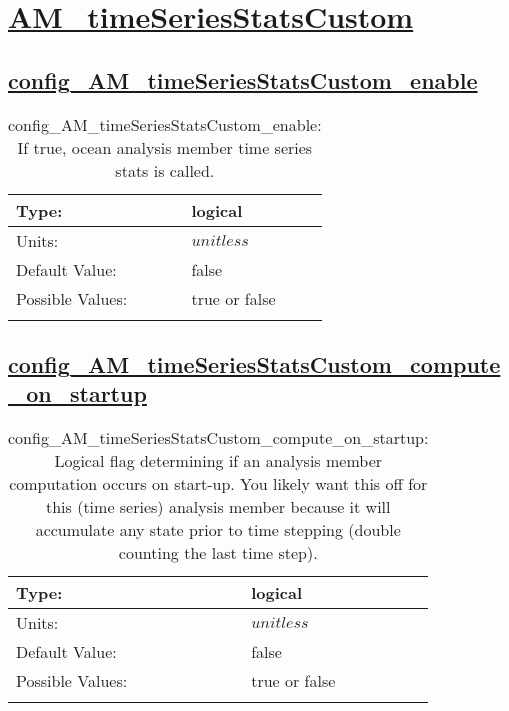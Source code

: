 \section[AM\_timeSeriesStatsCustom]{\hyperref[sec:nm_tab_AM_timeSeriesStatsCustom]{AM\_timeSeriesStatsCustom}}
\label{sec:nm_sec_AM_timeSeriesStatsCustom}
\subsection[config\_AM\_timeSeriesStatsCustom\_enable]{\hyperref[sec:nm_tab_AM_timeSeriesStatsCustom]{config\_AM\_timeSeriesStatsCustom\_enable}}
\label{subsec:nm_sec_config_AM_timeSeriesStatsCustom_enable}
\begin{center}
\begin{longtable}{| p{2.0in} || p{4.0in} |}
    \hline
    Type: & logical \\
    \hline
    Units: & $unitless$ \\
    \hline
    Default Value: & false \\
    \hline
    Possible Values: & true or false \\
    \hline
    \caption{config\_AM\_timeSeriesStatsCustom\_enable: If true, ocean analysis member time series stats is called.}
\end{longtable}
\end{center}
\subsection[config\_AM\_timeSeriesStatsCustom\_compute\_on\_startup]{\hyperref[sec:nm_tab_AM_timeSeriesStatsCustom]{config\_AM\_timeSeriesStatsCustom\_compute\_on\_startup}}
\label{subsec:nm_sec_config_AM_timeSeriesStatsCustom_compute_on_startup}
\begin{center}
\begin{longtable}{| p{2.0in} || p{4.0in} |}
    \hline
    Type: & logical \\
    \hline
    Units: & $unitless$ \\
    \hline
    Default Value: & false \\
    \hline
    Possible Values: & true or false \\
    \hline
    \caption{config\_AM\_timeSeriesStatsCustom\_compute\_on\_startup: Logical flag determining if an analysis member computation occurs on start-up. You likely want this off for this (time series) analysis member because it will accumulate any state prior to time stepping (double counting the last time step).}
\end{longtable}
\end{center}
